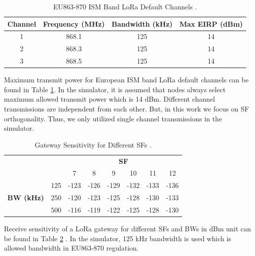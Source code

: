 \documentclass[conference]{IEEEtran}
\begin{document}
\begin{table}
\centering
\caption{EU863-870 ISM Band LoRa Default Channels \cite{lorawan.regional.parameters}.}
\label{table:max_tx_power}
\begin{tabular}{|c|c|c|c|}
\hline
\textbf{Channel} & \textbf{Frequency (MHz)} & \textbf{Bandwidth (kHz)} & \textbf{Max EIRP (dBm)} \\ \hline
      1 &     868.1 &   125 &   14 \\ \hline
      2 &     868.3 &   125 &   14 \\ \hline
      3 &     868.5 &   125 &   14 \\

\hline
\end{tabular}
\end{table}

\par Maximum transmit power for European ISM band LoRa default channels can be found in Table \ref{table:max_tx_power}. In the simulator, it is assumed that nodes always select maximum allowed transmit power which is 14 dBm. Different channel transmissions are independent from each other. But, in this work we focus on SF orthogonality. Thus, we only utilized single channel transmissions in the simulator.

\begin{table}
\centering
\caption{Gateway Sensitivity for Different SFs \cite{SX1276}.}
\label{table:gw_sf_sensitivity}
\begin{tabular}{|c|c|c|c|c|c|c|c|}
\hline
\multicolumn{2}{|c|}{\multirow{2}{*}{}} & \multicolumn{6}{c|}{\textbf{SF}} \\ \cline{3-8}
\multicolumn{2}{|c|}{}                  &    7 &    8 &    9 &   10 &   11 &   12 \\ \hline
\multirow{3}{*}{\textbf{BW (kHz)}}  & 125 & -123 & -126 & -129 & -132 & -133 & -136 \\ \cline{2-8}
                                    & 250 & -120 & -123 & -125 & -128 & -130 & -133 \\ \cline{2-8}
                                    & 500 & -116 & -119 & -122 & -125 & -128 & -130 \\ \hline
\end{tabular}
\end{table}

\par Receive sensitivity of a LoRa gateway for different SFs and BWs in dBm unit can be found in Table \ref{table:gw_sf_sensitivity} \cite{SX1276}. In the simulator, 125 kHz bandwidth is used which is allowed bandwidth in EU863-870 regulation.
\end{document}
